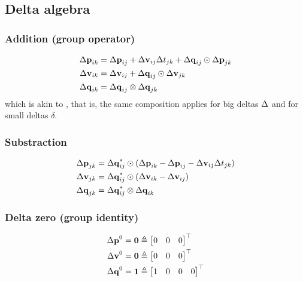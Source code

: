 \subsection{Delta algebra}

\subsubsection{Addition (group operator)}

\begin{align} \label{equ:composition_Delta}
\begin{split}
{\Delta{\bf p}}_{ik} 
&= {\Delta{\bf p}}_{ij} + {\Delta{\bf v}}_{ij}\Delta t_{jk} + {\Delta{\bf q}}_{ij}\odot{\Delta{\bf p}}_{jk} \\
{\Delta{\bf v}}_{ik} 
&= {\Delta{\bf v}}_{ij} + {\Delta{\bf q}}_{ij}\odot{\Delta{\bf v}}_{jk} \\
{\Delta{\bf q}}_{ik} 
&= {\Delta{\bf q}}_{ij}\otimes{\Delta{\bf q}}_{jk} 
\end{split}
\end{align}
%
which is akin to , that is, the same composition applies for big deltas $\Delta$ and for small deltas $\delta$.


\subsubsection{Substraction}

\begin{align} 
\begin{split}
{\Delta{\bf p}}_{jk} 
&= {\Delta{\bf q}}_{ij}^*\odot({\Delta{\bf p}}_{ik} - {\Delta{\bf p}}_{ij} - {\Delta{\bf v}}_{ij}\Delta t_{jk}) \\
{\Delta{\bf v}}_{jk} 
&= {\Delta{\bf q}}_{ij}^*\odot({\Delta{\bf v}}_{ik} - {\Delta{\bf v}}_{ij}) \\
{\Delta{\bf q}}_{jk} 
&= {\Delta{\bf q}}_{ij}^*\otimes{\Delta{\bf q}}_{ik} 
\end{split}
\end{align}

\subsubsection{Delta zero (group identity)}
%
\begin{align*}
{\Delta{\bf p}}^0 &= \bf0 \triangleq \begin{bmatrix}
0&0&0
\end{bmatrix}^{\top} \\
{\Delta{\bf v}}^0 &= \bf0 \triangleq \begin{bmatrix}
0&0&0
\end{bmatrix}^{\top} \\
{\Delta{\bf q}}^0 &= \bf1 \triangleq \begin{bmatrix}
1&0&0&0
\end{bmatrix}^{\top}
\end{align*}

